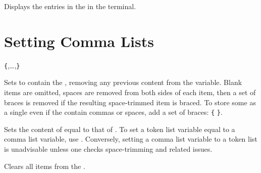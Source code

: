 \documentclass[oneside]{book}
\begin{document}
\begin{function}{\ClistVarShow}
\begin{syntax}
 
\end{syntax}
Displays the entries in the  in the terminal.
\end{function}

\section{Setting Comma Lists}

\begin{function}{\ClistSet}
\begin{syntax}
  \verb|{|,\ldots{},\verb|}|
\end{syntax}
Sets  to contain the ,
removing any previous content from the variable.
Blank items are omitted, spaces are removed from both sides of each
item, then a set of braces is removed if the resulting space-trimmed
item is braced.
To store some  as a single  even if the
 contain commas or spaces, add a set of braces:
  \verb|{|  \verb|}|.
\end{function}

\begin{function}{\ClistSetEq}
\begin{syntax}
  
\end{syntax}
Sets the content of  equal to that of
.  To set a token list variable equal to a comma
list variable, use .  Conversely, setting a comma
list variable to a token list is unadvisable unless one checks
space-trimming and related issues.
\end{function}


\begin{function}{\ClistClear}
\begin{syntax}
 
\end{syntax}
Clears all items from the .
\end{function}
\end{document}
